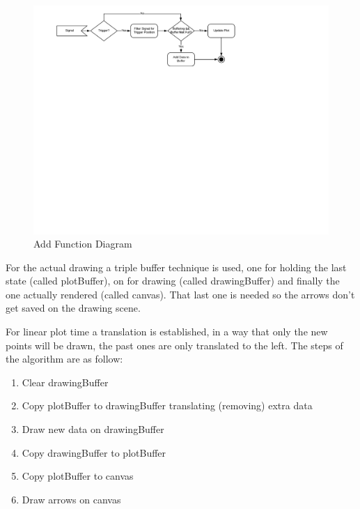 \begin{figure}[htb]
  \caption{Add Function Diagram}
  \label{react-plotter-add-diagram}
  \centering
  \includegraphics[scale=0.9]{images/react-plotter-add-diagram}
\end{figure}
For the actual drawing a triple buffer technique is used, one for holding the last
state (called plotBuffer), on for drawing (called drawingBuffer) and finally the
one actually rendered (called canvas). That last one is needed so the arrows don't
get saved on the drawing scene. 

For linear plot time a translation is established, in a way that only the new
points will be drawn, the past ones are only translated to the left. The steps
of the algorithm are as follow:
\begin{enumerate}
  \item Clear drawingBuffer
  \item Copy plotBuffer to drawingBuffer translating (removing) extra data
  \item Draw new data on drawingBuffer
  \item Copy drawingBuffer to plotBuffer
  \item Copy plotBuffer to canvas
  \item Draw arrows on canvas
\end{enumerate}

